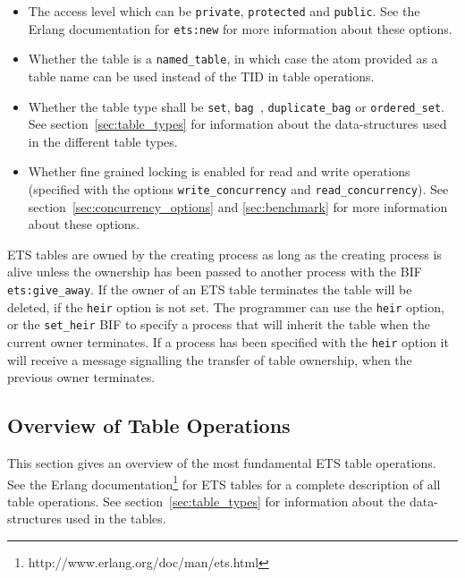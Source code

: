 \documentclass[aps,pre,preprint,nofootinbib]{revtex4}
\begin{document}
\begin{itemize}
\item 
  The access level which can be \verb|private|, \verb|protected| and \verb|public|.
  See the Erlang documentation for \verb|ets:new| for more information about these options.
\item
  Whether the table is a \verb|named_table|, in which case the atom provided as a table name can be used instead of the TID in table operations.
\item 
  Whether the table type shall be \verb|set|, \verb|bag |, \verb|duplicate_bag| or \verb|ordered_set|. 
  See section~\ref{sec:table_types} for information about the data-structures used in the different table types.
\item 
  Whether fine grained locking is enabled for read and write operations (specified with the options \verb|write_concurrency| and \verb|read_concurrency|). 
  See section~\ref{sec:concurrency_options} and \ref{sec:benchmark} for more information about these options.
\end{itemize}

ETS tables are owned by the creating process as long as the creating process is alive unless the ownership has been passed to another process with the BIF \verb|ets:give_away|.
If the owner of an ETS table terminates the table will be deleted, if the \verb|heir| option is not set.
The programmer can use the \verb|heir| option, or the \verb|set_heir| BIF to specify a process that will inherit the table when the current owner terminates. 
If a process has been specified with the \verb|heir| option it will receive a message signalling the transfer of table ownership, when the previous owner terminates.

\subsection{Overview of Table Operations}

This section gives an overview of the most fundamental ETS table operations. 
See the Erlang documentation\footnote{http://www.erlang.org/doc/man/ets.html} for ETS tables for a complete description of all table operations. 
See section~\ref{sec:table_types} for information about the data-structures used in the tables.
\end{document}
